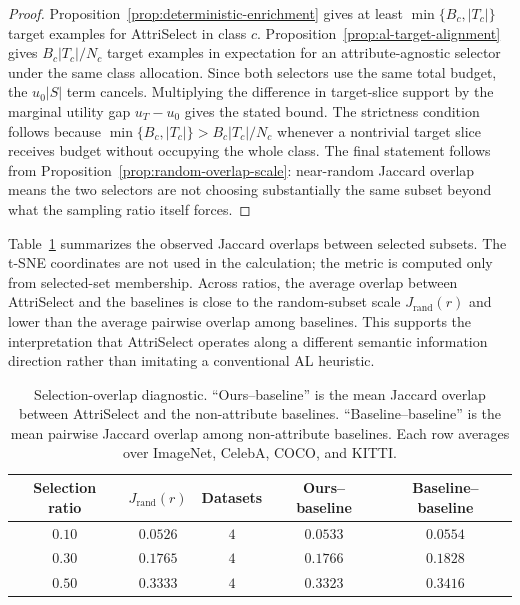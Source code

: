 \documentclass{article}
\newcommand{\model}{AttriSelect\xspace}
\begin{document}
\begin{proof}
Proposition~\ref{prop:deterministic-enrichment} gives at least $\min\{B_c,|T_c|\}$ target examples for \model in class $c$. Proposition~\ref{prop:al-target-alignment} gives $B_c|T_c|/N_c$ target examples in expectation for an attribute-agnostic selector under the same class allocation. Since both selectors use the same total budget, the $u_0|S|$ term cancels. Multiplying the difference in target-slice support by the marginal utility gap $u_T-u_0$ gives the stated bound. The strictness condition follows because $\min\{B_c,|T_c|\}>B_c|T_c|/N_c$ whenever a nontrivial target slice receives budget without occupying the whole class. The final statement follows from Proposition~\ref{prop:random-overlap-scale}: near-random Jaccard overlap means the two selectors are not choosing substantially the same subset beyond what the sampling ratio itself forces.
\end{proof}

Table~\ref{tab:selection-overlap-summary} summarizes the observed Jaccard overlaps between selected subsets. The t-SNE coordinates are not used in the calculation; the metric is computed only from selected-set membership. Across ratios, the average overlap between \model and the baselines is close to the random-subset scale $J_{\mathrm{rand}}(r)$ and lower than the average pairwise overlap among baselines. This supports the interpretation that \model operates along a different semantic information direction rather than imitating a conventional AL heuristic.

\begin{table}[h]
\centering
\caption{Selection-overlap diagnostic. ``Ours--baseline'' is the mean Jaccard overlap between \model and the non-attribute baselines. ``Baseline--baseline'' is the mean pairwise Jaccard overlap among non-attribute baselines. Each row averages over ImageNet, CelebA, COCO, and KITTI.}
\label{tab:selection-overlap-summary}
\begin{tabular}{c c c c c}
\toprule
Selection ratio & $J_{\mathrm{rand}}(r)$ & Datasets & Ours--baseline & Baseline--baseline \\
\midrule
$0.10$ & $0.0526$ & $4$ & $0.0533$ & $0.0554$ \\
$0.30$ & $0.1765$ & $4$ & $0.1766$ & $0.1828$ \\
$0.50$ & $0.3333$ & $4$ & $0.3323$ & $0.3416$ \\
\bottomrule
\end{tabular}
\end{table}
\end{document}
